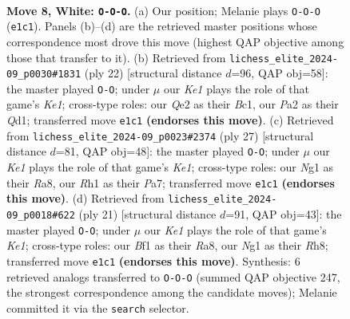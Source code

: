 \documentclass[11pt]{article}
\begin{document}
\begin{figure}[p]\centering
\begin{subfigure}{0.46\textwidth}\centering
\resizebox{\linewidth}{!}{%
\newchessgame
\chessboard[
  setfen={rnb2rk1/pppnqppp/4p3/3pP3/3P4/2N5/PPP1QPPP/R3KBNR w KQ - 2 8},
  showmover=false,
  pgfstyle=straightmove, color=movearrow, markmove={e1-c1}
]}
\caption{}
\end{subfigure}\hfill
\begin{subfigure}{0.46\textwidth}\centering
\resizebox{\linewidth}{!}{%
\newchessgame
\chessboard[
  setfen={rn1q1rk1/4b1pp/p2ppn2/1p2p3/4P3/P1NB3P/1PP2PP1/R1BQK2R w KQ - 0 12},
  showmover=false,
  pgfstyle=straightmove, color=movearrow, markmove={e1-g1}
]}
\caption{}
\end{subfigure}
\\[4pt]
\begin{subfigure}{0.46\textwidth}\centering
\resizebox{\linewidth}{!}{%
\newchessgame
\chessboard[
  setfen={r2qk2r/pp3pb1/2p1nnpp/3p4/3P4/2NQPP2/PP2NBPP/R4RK1 b kq - 6 14},
  showmover=false,
  pgfstyle=straightmove, color=movearrow, markmove={e8-g8}
]}
\caption{}
\end{subfigure}\hfill
\begin{subfigure}{0.46\textwidth}\centering
\resizebox{\linewidth}{!}{%
\newchessgame
\chessboard[
  setfen={r2qk2r/pp2bppp/2n1pn2/2p5/3pPP2/3P1N2/PPP1Q1PP/R1BN1RK1 b kq - 2 11},
  showmover=false,
  pgfstyle=straightmove, color=movearrow, markmove={e8-g8}
]}
\caption{}
\end{subfigure}
\caption{\textbf{Move 8, White: \texttt{O-O-O}.} (a) Our position; Melanie plays \texttt{O-O-O} (\texttt{e1c1}). Panels (b)--(d) are the retrieved master positions whose correspondence most drove this move (highest QAP objective among those that transfer to it). (b) Retrieved from \texttt{lichess\_elite\_2024-09\_p0030\#1831} (ply 22) [structural distance $d$=96, QAP obj=58]: the master played \texttt{O-O}; under $\mu$ our \emph{Ke1} plays the role of that game's \emph{Ke1}; cross-type roles: our \emph{Q}e2 as their \emph{B}c1, our \emph{P}a2 as their \emph{Q}d1; transferred move \texttt{e1c1} \textbf{(endorses this move)}. (c) Retrieved from \texttt{lichess\_elite\_2024-09\_p0023\#2374} (ply 27) [structural distance $d$=81, QAP obj=48]: the master played \texttt{O-O}; under $\mu$ our \emph{Ke1} plays the role of that game's \emph{Ke1}; cross-type roles: our \emph{N}g1 as their \emph{R}a8, our \emph{R}h1 as their \emph{P}a7; transferred move \texttt{e1c1} \textbf{(endorses this move)}. (d) Retrieved from \texttt{lichess\_elite\_2024-09\_p0018\#622} (ply 21) [structural distance $d$=91, QAP obj=43]: the master played \texttt{O-O}; under $\mu$ our \emph{Ke1} plays the role of that game's \emph{Ke1}; cross-type roles: our \emph{B}f1 as their \emph{R}a8, our \emph{N}g1 as their \emph{R}h8; transferred move \texttt{e1c1} \textbf{(endorses this move)}. Synthesis: 6 retrieved analogs transferred to \texttt{O-O-O} (summed QAP objective 247, the strongest correspondence among the candidate moves); Melanie committed it via the \texttt{search} selector.}
\label{fig:thought-m14}
\end{figure}
\end{document}
